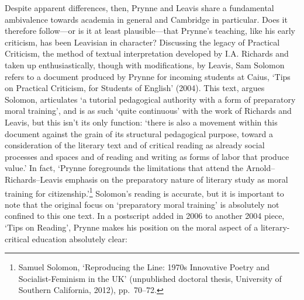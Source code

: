 \documentclass[]{article}
\begin{document}
Despite apparent differences, then, Prynne and Leavis share a
fundamental ambivalence towards academia in general and Cambridge in
particular. Does it therefore follow---or is it at least
plausible---that Prynne's teaching, like his early criticism, has been
Leavisian in character? Discussing the legacy of Practical Criticism,
the method of textual interpretation developed by I.A. Richards and
taken up enthusiastically, though with modifications, by Leavis, Sam
Solomon refers to a document produced by Prynne for incoming students at
Caius, `Tips on Practical Criticism, for Students of English' (2004).
This text, argues Solomon, articulates `a tutorial pedagogical authority
with a form of preparatory moral training', and is as such `quite
continuous' with the work of Richards and Leavis, but this isn't its
only function: `there is also a movement within this document against
the grain of its structural pedagogical purpose, toward a consideration
of the literary text and of critical reading as already social processes
and spaces and of reading and writing as forms of labor that produce
value.' In fact, `Prynne foregrounds the limitations that attend the
Arnold--Richards--Leavis emphasis on the preparatory nature of literary
study as moral training for citizenship.'\footnote{Samuel Solomon,
  `Reproducing the Line: 1970s Innovative Poetry and Socialist-Feminism
  in the UK' (unpublished doctoral thesis, University of Southern
  California, 2012), pp.~70--72.} Solomon's reading is accurate, but it
is important to note that the original focus on `preparatory moral
training' is absolutely not confined to this one text. In a postscript
added in 2006 to another 2004 piece, `Tips on Reading', Prynne makes his
position on the moral aspect of a literary-critical education absolutely
clear:
\end{document}
